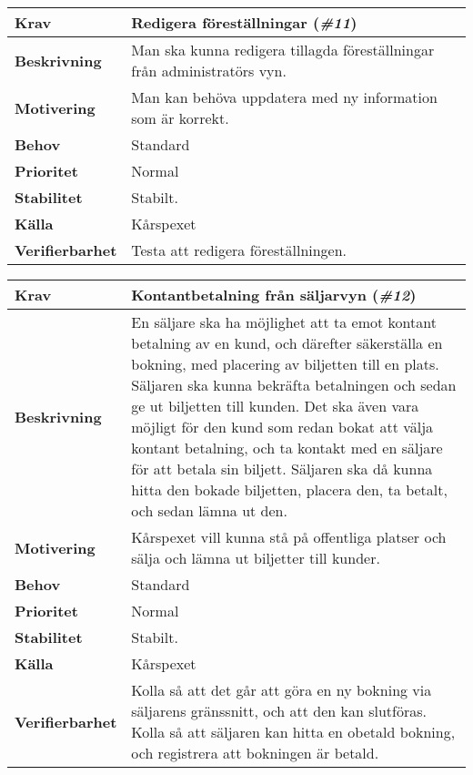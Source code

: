 \documentclass[a4paper, twoside, 11pt, titlepage]{article}
\begin{document}
	\begin{tabular} { p{2.6cm} p{12.5cm} }
		\hline
		\sffamily\textbf{Krav} & Redigera föreställningar (\emph{\#11})  \\
		\hline
		\sffamily\textbf{Beskrivning} & Man ska kunna redigera tillagda föreställningar från administratörs vyn.  \\
		\hline
		\sffamily\textbf{Motivering} & Man kan behöva uppdatera med ny information som är korrekt.   \\
		\hline
		\sffamily\textbf{Behov} & Standard  \\
		\hline
		\sffamily\textbf{Prioritet} & Normal  \\
		\hline
		\sffamily\textbf{Stabilitet} & Stabilt.  \\
		\hline
		\sffamily\textbf{Källa} & Kårspexet  \\
		\hline
		\sffamily\textbf{Verifierbarhet} & Testa att redigera föreställningen.  \\
		\hline
	\end{tabular}
	\vspace{6mm}

	\begin{tabular} { p{2.6cm} p{12.5cm} }
		\hline
		\sffamily\textbf{Krav} & Kontantbetalning från säljarvyn (\emph{\#12})  \\
		\hline
		\sffamily\textbf{Beskrivning} & En säljare ska ha möjlighet att ta emot kontant betalning av en kund, och därefter säkerställa en bokning, med placering av biljetten till en plats. Säljaren ska kunna bekräfta betalningen och sedan ge ut biljetten till kunden. Det ska även vara möjligt för den kund som redan bokat att välja kontant betalning, och ta kontakt med en säljare för att betala sin biljett. Säljaren ska då kunna hitta den bokade biljetten, placera den, ta betalt, och sedan lämna ut den.  \\
		\hline
		\sffamily\textbf{Motivering} & Kårspexet vill kunna stå på offentliga platser och sälja och lämna ut biljetter till kunder.  \\
		\hline
		\sffamily\textbf{Behov} & Standard  \\
		\hline
		\sffamily\textbf{Prioritet} & Normal  \\
		\hline
		\sffamily\textbf{Stabilitet} & Stabilt.  \\
		\hline
		\sffamily\textbf{Källa} & Kårspexet  \\
		\hline
		\sffamily\textbf{Verifierbarhet} & Kolla så att det går att göra en ny bokning via säljarens gränssnitt, och att den kan slutföras. Kolla så att säljaren kan hitta en obetald bokning, och registrera att bokningen är betald.  \\
		\hline
	\end{tabular}
	\vspace{6mm}
\end{document}
